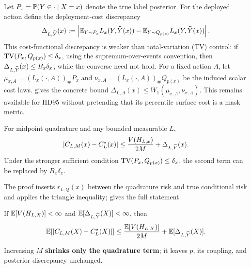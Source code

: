 Let \(P_x=\mathbb{P}(Y\in\cdot\mid X=x)\) denote the true label posterior. For the
deployed action define the deployment-cost discrepancy
\begin{equation}
  \Delta_{L,\widehat{Y}}(x)
  :=
  \left|
    \mathbb{E}_{Y\sim P_x}L_x(Y,\widehat{Y}(x))
    -
    \mathbb{E}_{Y\sim Q_{p(x)}}L_x(Y,\widehat{Y}(x))
  \right|.
  \label{eq:loss-discrepancy}
\end{equation}
This cost-functional discrepancy is weaker than total-variation (TV) control: if
\(\operatorname{TV}(P_x,Q_{p(x)})\leq\delta_x\), using the supremum-over-events convention,
then \(\Delta_{L,\widehat{Y}}(x)\leq B_x\delta_x\), while the converse need not hold.
For a fixed action \(A\), let
\(\mu_{x,A}=(L_x(\cdot,A))_\#P_x\) and
\(\nu_{x,A}=(L_x(\cdot,A))_\#Q_{p(x)}\) be the induced scalar cost laws.
 gives the concrete bound
\(\Delta_{L,A}(x)\leq W_1(\mu_{x,A},\nu_{x,A})\). This remains available for
HD95 without pretending that its percentile surface cost is a mask metric.

\begin{proposition}
\label{prop:total-bound}
For midpoint quadrature and any bounded measurable \(L\),
\begin{equation}
  \left|C_{L,M}(x)-C_L^\star(x)\right|
  \leq
  \frac{V(H_{L,x})}{2M}
  +\Delta_{L,\widehat{Y}}(x).
  \label{eq:decomp}
\end{equation}
Under the stronger sufficient condition
\(\operatorname{TV}(P_x,Q_{p(x)})\leq\delta_x\), the second term can be replaced by
\(B_x\delta_x\).
\end{proposition}
The proof inserts \(r_{L,Q}(x)\) between the quadrature risk and true
conditional risk and applies the triangle inequality; 
gives the full statement.

\begin{corollary}
\label{cor:population-bound}
If \(\mathbb{E}[V(H_{L,X})]<\infty\) and
\(\mathbb{E}[\Delta_{L,\widehat{Y}}(X)]<\infty\), then
\begin{equation*}
  \mathbb{E}\!\left[
    \left|C_{L,M}(X)-C_L^\star(X)\right|
  \right]
  \leq
  \frac{\mathbb{E}[V(H_{L,X})]}{2M}
  +\mathbb{E}[\Delta_{L,\widehat{Y}}(X)].
\end{equation*}
\end{corollary}

Increasing \(M\) \textbf{shrinks only the quadrature term}; it leaves \(p\), its coupling,
and posterior discrepancy unchanged.

